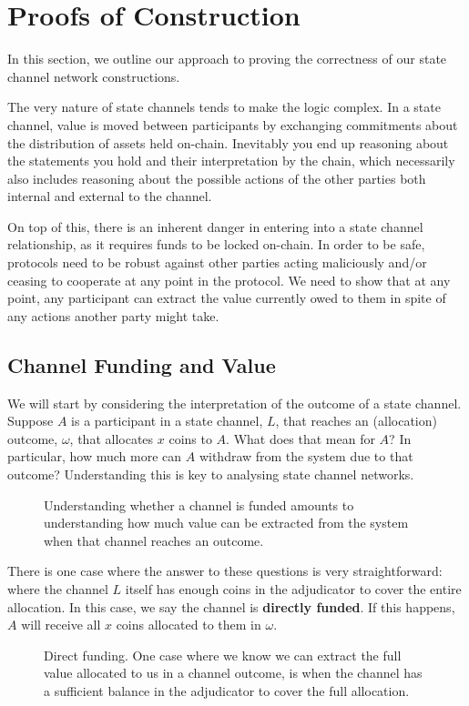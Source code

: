 \section{Proofs of Construction}\label{sec:reasoning}

In this section, we outline our approach to proving the correctness of our state channel network constructions.

The very nature of state channels tends to make the logic complex.
In a state channel, value is moved between participants by exchanging commitments about the distribution of assets held on-chain.
Inevitably you end up reasoning about the statements you hold and their interpretation by the chain, which necessarily also includes reasoning about the possible actions of the other parties both internal and external to the channel.

On top of this, there is an inherent danger in entering into a state channel relationship, as it requires funds to be locked on-chain.
In order to be safe, protocols need to be robust against other parties acting maliciously and/or ceasing to cooperate at any point in the protocol.
We need to show that at any point, any participant can extract the value currently owed to them in spite of any actions another party might take.

\subsection{Channel Funding and Value}

We will start by considering the interpretation of the outcome of a state channel.
Suppose $A$ is a participant in a state channel, $L$, that reaches an (allocation) outcome, $\omega$, that allocates $x$ coins to $A$.
What does that mean for $A$?
In particular, how much more can $A$ withdraw from the system due to that outcome?
Understanding this is key to analysing state channel networks.

\begin{figure}[h]\centering
  \makebox[\textwidth][c]{}
  \caption{
    Understanding whether a channel is funded amounts to understanding how much value can be extracted from the system when that channel reaches an outcome.
  }\label{fig:meaning-of-funding}
\end{figure}

There is one case where the answer to these questions is very straightforward:
where the channel $L$ itself has enough coins in the adjudicator to cover the entire allocation.
In this case, we say the channel is \textbf{directly funded}.
If this happens, $A$ will receive all $x$ coins allocated to them in $\omega$.
\begin{figure}[h]\centering
  \makebox[\textwidth][c]{}
  \caption{
    Direct funding.
    One case where we know we can extract the full value allocated to us in a channel outcome, is when the channel has a sufficient balance in the adjudicator to cover the full allocation.
  }\label{fig:direct-funding}
\end{figure}

